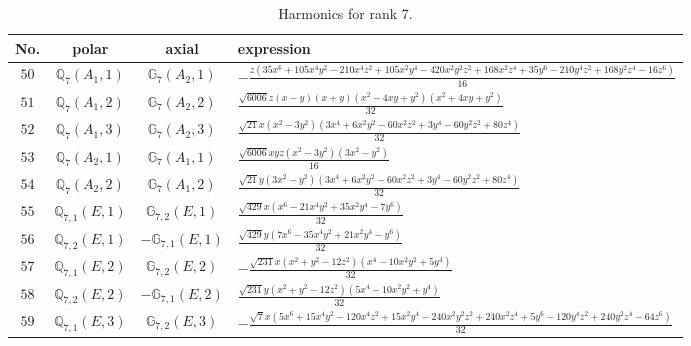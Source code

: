\documentclass[fleqn,8pt,landscape]{jsarticle}
\begin{document}
\begin{table}[ht!]
\begin{center}
\caption{Harmonics for rank 7.}
\renewcommand{\arraystretch}{1.3}
\begin{tabular}{cccl} \hline \hline
No. & polar & axial & expression \\ \hline
$ 50 $ & $ \mathbb{Q}_{7}(A_{1},1) $ & $ \mathbb{G}_{7}(A_{2},1) $ & $ - \frac{z \left(35 x^{6} + 105 x^{4} y^{2} - 210 x^{4} z^{2} + 105 x^{2} y^{4} - 420 x^{2} y^{2} z^{2} + 168 x^{2} z^{4} + 35 y^{6} - 210 y^{4} z^{2} + 168 y^{2} z^{4} - 16 z^{6}\right)}{16} $ \\
$ 51 $ & $ \mathbb{Q}_{7}(A_{1},2) $ & $ \mathbb{G}_{7}(A_{2},2) $ & $ \frac{\sqrt{6006} z \left(x - y\right) \left(x + y\right) \left(x^{2} - 4 x y + y^{2}\right) \left(x^{2} + 4 x y + y^{2}\right)}{32} $ \\
$ 52 $ & $ \mathbb{Q}_{7}(A_{1},3) $ & $ \mathbb{G}_{7}(A_{2},3) $ & $ \frac{\sqrt{21} x \left(x^{2} - 3 y^{2}\right) \left(3 x^{4} + 6 x^{2} y^{2} - 60 x^{2} z^{2} + 3 y^{4} - 60 y^{2} z^{2} + 80 z^{4}\right)}{32} $ \\
$ 53 $ & $ \mathbb{Q}_{7}(A_{2},1) $ & $ \mathbb{G}_{7}(A_{1},1) $ & $ \frac{\sqrt{6006} x y z \left(x^{2} - 3 y^{2}\right) \left(3 x^{2} - y^{2}\right)}{16} $ \\
$ 54 $ & $ \mathbb{Q}_{7}(A_{2},2) $ & $ \mathbb{G}_{7}(A_{1},2) $ & $ \frac{\sqrt{21} y \left(3 x^{2} - y^{2}\right) \left(3 x^{4} + 6 x^{2} y^{2} - 60 x^{2} z^{2} + 3 y^{4} - 60 y^{2} z^{2} + 80 z^{4}\right)}{32} $ \\
$ 55 $ & $ \mathbb{Q}_{7,1}(E,1) $ & $ \mathbb{G}_{7,2}(E,1) $ & $ \frac{\sqrt{429} x \left(x^{6} - 21 x^{4} y^{2} + 35 x^{2} y^{4} - 7 y^{6}\right)}{32} $ \\
$ 56 $ & $ \mathbb{Q}_{7,2}(E,1) $ & $ -\mathbb{G}_{7,1}(E,1) $ & $ \frac{\sqrt{429} y \left(7 x^{6} - 35 x^{4} y^{2} + 21 x^{2} y^{4} - y^{6}\right)}{32} $ \\
$ 57 $ & $ \mathbb{Q}_{7,1}(E,2) $ & $ \mathbb{G}_{7,2}(E,2) $ & $ - \frac{\sqrt{231} x \left(x^{2} + y^{2} - 12 z^{2}\right) \left(x^{4} - 10 x^{2} y^{2} + 5 y^{4}\right)}{32} $ \\
$ 58 $ & $ \mathbb{Q}_{7,2}(E,2) $ & $ -\mathbb{G}_{7,1}(E,2) $ & $ \frac{\sqrt{231} y \left(x^{2} + y^{2} - 12 z^{2}\right) \left(5 x^{4} - 10 x^{2} y^{2} + y^{4}\right)}{32} $ \\
$ 59 $ & $ \mathbb{Q}_{7,1}(E,3) $ & $ \mathbb{G}_{7,2}(E,3) $ & $ - \frac{\sqrt{7} x \left(5 x^{6} + 15 x^{4} y^{2} - 120 x^{4} z^{2} + 15 x^{2} y^{4} - 240 x^{2} y^{2} z^{2} + 240 x^{2} z^{4} + 5 y^{6} - 120 y^{4} z^{2} + 240 y^{2} z^{4} - 64 z^{6}\right)}{32} $ \\

\end{tabular}
\end{center}
\end{table}
\end{document}
